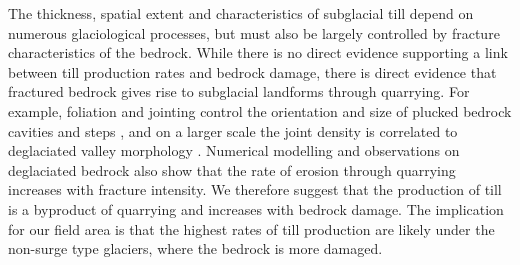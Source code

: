 \documentclass[review]{igs}
\begin{document}
The thickness, spatial extent and characteristics of subglacial till depend on numerous glaciological processes, but must also be largely controlled by fracture characteristics of the bedrock. While there is no direct evidence supporting a link between till production rates and bedrock damage, there is direct evidence that fractured bedrock gives rise to subglacial landforms through quarrying. For example, foliation and jointing control the orientation and size of plucked bedrock cavities and steps \citep{Glasser1998,Krabbendam2011,Hooyer2012,Kelly2014}, and on a larger scale the joint density is correlated to deglaciated valley morphology \citep{Augustinus1995,Augustinus1992,Brook2002,Brook2004,Leith2014}. Numerical modelling \citep{Iverson2012} and observations on deglaciated bedrock \citep{Duhnforth2010} also show that the rate of erosion through quarrying increases with fracture intensity. We therefore suggest that the production of till is a byproduct of quarrying and increases with bedrock damage. The implication for our field area is that the highest rates of till production are likely under the non-surge type glaciers, where the bedrock is more damaged. 
\end{document}
